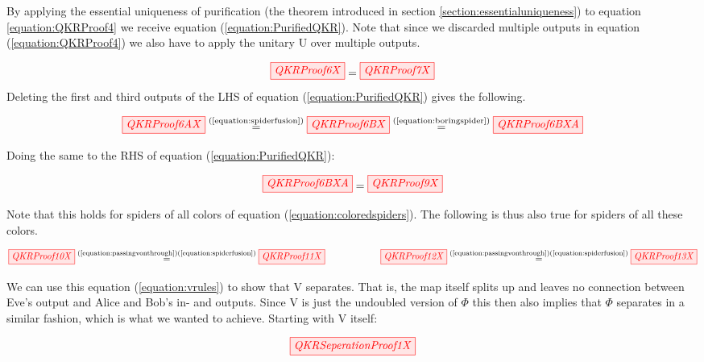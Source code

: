\documentclass[]{article}
\newcommand{\equaltext}[1]{\ensuremath{\stackrel{\text{#1}}{=}}}
\begin{document}
By applying the essential uniqueness of purification (the theorem introduced in section \ref{section:essentialuniqueness}) to equation \ref{equation:QKRProof4} we receive equation (\ref{equation:PurifiedQKR}). Note that since we discarded multiple outputs in equation (\ref{equation:QKRProof4}) we also have to apply the unitary U over multiple outputs.

\begin{equation}
	\label{equation:PurifiedQKR}
	\tikzfig{QKRProof6X} = \tikzfig{QKRProof7X}
\end{equation}
\newpage
Deleting the first and third outputs of the LHS of equation (\ref{equation:PurifiedQKR}) gives the following.

\begin{equation}
	\tikzfig{QKRProof6AX} \equaltext{(\ref{equation:spiderfusion})} \tikzfig{QKRProof6BX} \equaltext{(\ref{equation:boringspider})} \tikzfig{QKRProof6BXA}
\end{equation}

Doing the same to the RHS of equation (\ref{equation:PurifiedQKR}):

\begin{equation}
	\label{equation:passingvonthrough}
	 \tikzfig{QKRProof6BXA} = \tikzfig{QKRProof9X}
\end{equation}

Note that this holds for spiders of all colors of equation (\ref{equation:coloredspiders}). The following is thus also true for spiders of all these colors.

\begin{equation}
\label{equation:vrules}
	\tikzfig{QKRProof10X} \equaltext{(\ref{equation:passingvonthrough})(\ref{equation:spiderfusion})} \tikzfig{QKRProof11X} ~~~~~~~~~~~~~~~~~~ \tikzfig{QKRProof12X} \equaltext{(\ref{equation:passingvonthrough})(\ref{equation:spiderfusion})} \tikzfig{QKRProof13X}
\end{equation}

We can use this equation (\ref{equation:vrules}) to show that V separates. That is, the map itself splits up and leaves no connection between Eve's output and Alice and Bob's in- and outputs. Since V is just the undoubled version of $\Phi$ this then also implies that $\Phi$ separates in a similar fashion, which is what we wanted to achieve. Starting with V itself:

\begin{equation}
	\label{equation:v}
	\tikzfig{QKRSeperationProof1X}
\end{equation}
\end{document}
